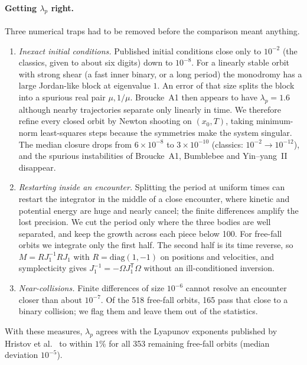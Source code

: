 \documentclass[11pt]{article}
\theoremstyle{remark}
\begin{document}
\paragraph{Getting $\lambda_p$ right.} Three numerical traps had to be removed before the comparison meant
anything.
\begin{enumerate}[leftmargin=*]
\item \emph{Inexact initial conditions.} Published initial conditions close only to $10^{-2}$ (the classics,
  given to about six digits) down to $10^{-8}$. For a linearly stable orbit with strong shear (a fast inner
  binary, or a long period) the monodromy has a large Jordan-like block at eigenvalue $1$. An error of that size
  splits the block into a spurious real pair $\mu,1/\mu$. Broucke~A1 then appears to have $\lambda_p=1.6$
  although nearby trajectories separate only linearly in time. We therefore refine every closed orbit by Newton
  shooting on $(x_0,T)$, taking minimum-norm least-squares steps because the symmetries make the system
  singular. The median closure drops from $6\times10^{-8}$ to $3\times10^{-10}$ (classics: $10^{-2}\to10^{-12}$),
  and the spurious instabilities of Broucke~A1, Bumblebee and Yin--yang~II disappear.
\item \emph{Restarting inside an encounter.} Splitting the period at uniform times can restart the integrator in
  the middle of a close encounter, where kinetic and potential energy are huge and nearly cancel; the finite
  differences amplify the lost precision. We cut the period only where the three bodies are well separated, and
  keep the growth across each piece below 100. For free-fall orbits we integrate only the first half. The second
  half is its time reverse, so $M=RJ_1^{-1}RJ_1$ with $R=\mathrm{diag}(1,-1)$ on positions and velocities, and
  symplecticity gives $J_1^{-1}=-\Omega J_1^{\mathsf T}\Omega$ without an ill-conditioned inversion.
\item \emph{Near-collisions.} Finite differences of size $10^{-6}$ cannot resolve an encounter closer than about
  $10^{-7}$. Of the 518 free-fall orbits, 165 pass that close to a binary collision; we flag them and leave them
  out of the statistics.
\end{enumerate}
\noindent With these measures, $\lambda_p$ agrees with the Lyapunov exponents published by Hristov et al.\
\cite{Hristov2024} to within $1\%$ for all 353 remaining free-fall orbits (median deviation $10^{-5}$).
\end{document}
